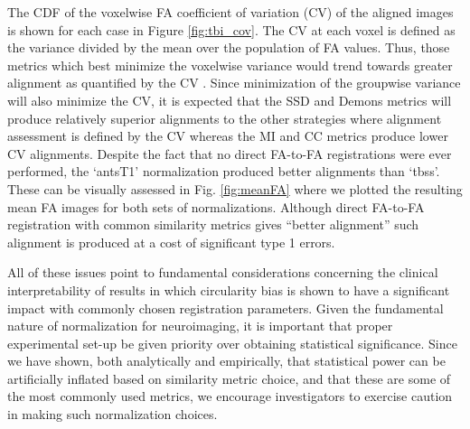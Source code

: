 \documentclass[final,5p,times,twocolumn]{elsarticle}
\begin{document}




The CDF of the voxelwise FA coefficient of variation (CV) of the aligned
images is shown for each case in Figure \ref{fig:tbi_cov}.  
The CV at each voxel is defined as the variance
divided by the mean over the population of FA values.  Thus,
those metrics which best minimize the voxelwise variance would
trend towards greater alignment as quantified by the CV \cite{van-hecke2011}.
Since minimization of the groupwise variance
will also minimize the CV, it is expected that the SSD and Demons 
metrics will produce relatively superior alignments to the
other strategies 
where alignment assessment is defined by the CV whereas the MI and CC metrics 
produce lower CV alignments.  Despite the fact that no direct FA-to-FA 
registrations were ever performed, the `antsT1' normalization produced better alignments
than `tbss'.  These can be visually assessed in Fig. \ref{fig:meanFA} where
we plotted the resulting mean FA images for both sets of normalizations.
Although direct FA-to-FA registration with common
similarity metrics gives ``better alignment'' such alignment is 
produced at a cost of significant type 1 errors.  

All of these issues point to fundamental considerations concerning the
clinical interpretability of results in which circularity bias is shown 
to have a significant impact with commonly chosen registration 
parameters.  Given the fundamental nature of normalization for
neuroimaging, it is important that proper experimental set-up be
given priority over obtaining statistical significance.  Since
we have shown, both analytically and empirically,  that statistical 
power can be artificially inflated based on similarity metric choice,
and that these are some of the most commonly used metrics, we encourage
investigators to exercise caution in making such normalization choices.
\end{document}
